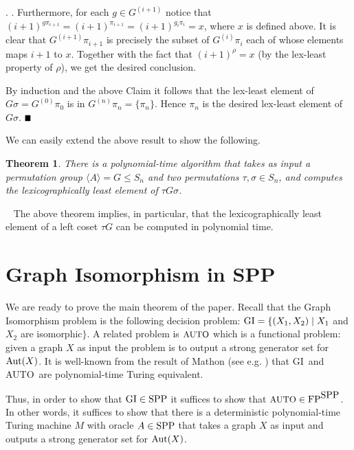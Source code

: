 \documentclass{article}
\newtheorem{theorem}{Theorem}[section]
\newcommand{\bproof}{\noindent{\it Proof}}
\newcommand{\cproof}{\noindent{\it Proof of Claim}}
\newcommand{\eproof}{\hspace*{\fill}$\rule{2mm}{2mm}$~~~~~\bigskip}
\renewenvironment{proof}{\bproof. }{\eproof}
\newenvironment{claimproof}{\cproof. }{\hspace*{\fill}\vspace{5mm}}
\newenvironment{remark}{\begin{trivlist}%
\item[\hskip\labelsep{\bf Remark.}]~}{\end{trivlist}}
\newcommand{\FP}{\mbox{\rm FP}}
\newcommand{\SPP}{\mbox{\rm SPP}}
\newcommand{\AUTO}{\mbox{\small\rm AUTO}}
\newcommand{\GI}{{\rm{GI}}}
\newcommand {\Aut}[1]{{\rm Aut}({#1})}
\renewcommand{\angle}[1]{\langle #1\rangle}
\begin{document}
\begin{proof}
\begin{claimproof}
  Furthermore, for each $g\in G^{(i+1)}$ notice that $(i+1)^{g
    \pi_{i+1}} = (i+1)^{\pi_{i+1}} = (i+1)^{g_i \pi_i}=x$, where $x$
  is defined above. It is clear that $G^{(i+1)}\pi_{i+1}$ is precisely
  the subset of $G^{(i)}\pi_i$ each of whose elements maps $i+1$ to $x$.
  Together with the fact that $(i+1)^\rho = x$ (by the lex-least
  property of $\rho$), we get the desired conclusion.
\end{claimproof}

By induction and the above Claim it follows that the lex-least element
of $G\sigma=G^{(0)}\pi_0$ is in $G^{(n)}\pi_n=\{\pi_n\}$. Hence $\pi_n$
is the desired lex-least element of $G\sigma$.
\end{proof}

We can easily extend the above result to show the following.

\begin{theorem}
  There is a polynomial-time algorithm that takes as input a
  permutation group $\angle{A}=G \leq S_n$ and two permutations $\tau,
  \sigma\in S_n$, and computes the lexicographically least element of
  $\tau G \sigma$.
\end{theorem}

\begin{remark}
  The above theorem implies, in particular, that the lexicographically
  least element of a left coset $\tau G$ can be computed in polynomial
  time.
\end{remark}

\section{Graph Isomorphism in SPP}

We are ready to prove the main theorem of the paper. Recall that the
Graph Isomorphism problem is the following decision problem:
$\GI=\{(X_1,X_2)\mid X_1$ and $X_2$ are isomorphic$\}$. A related
problem is $\AUTO$ which is a functional problem: given a graph $X$ as
input the problem is to output a strong generator set for $\Aut X$.
It is well-known from the result of Mathon \cite{mathon79anote} (see
e.g.  \cite{gi-book}) that \GI\ and \AUTO\ are polynomial-time Turing
equivalent.

Thus, in order to show that $\GI\in\SPP$ it suffices to show that
$\AUTO\in\FP^{\SPP}$. In other words, it suffices to show that there
is a deterministic polynomial-time Turing machine $M$ with oracle
$A\in\SPP$ that takes a graph $X$ as input and outputs a strong
generator set for $\Aut X$.
\end{document}
